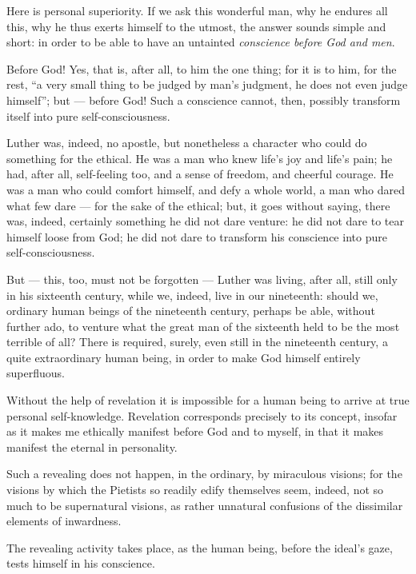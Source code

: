 \documentclass[12pt,a4paper]{book}
\begin{document}
Here is personal superiority. If we ask this wonderful man, why he endures all this, why he thus exerts himself to the utmost, the answer sounds simple and short: in order to be able to have an untainted \emph{conscience before God and men}.

Before God! Yes, that is, after all, to him the one thing; for it is to him, for the rest, ``a very small thing to be judged by man's judgment, he does not even judge himself''; but --- before God! Such a conscience cannot, then, possibly transform itself into pure self-consciousness.

Luther was, indeed, no apostle, but nonetheless a character who could do something for the ethical. He was a man who knew life's joy and life's pain; he had, after all, self-feeling too, and a sense of freedom, and cheerful courage. He was a man who could comfort himself, and defy a whole world, a man who dared what few dare --- for the sake of the ethical; but, it goes without saying, there was, indeed, certainly something he did not dare venture: he did not dare to tear himself loose from God; he did not dare to transform his conscience into pure self-consciousness.

But --- this, too, must not be forgotten --- Luther was living, after all, still only in his sixteenth century, while we, indeed, live in our
nineteenth: should we, ordinary human beings of the nineteenth century, perhaps be able, without further ado, to venture what the great man of the sixteenth held to be the most terrible of all? There is required, surely, even still in the nineteenth century, a quite extraordinary human being, in order to make God himself entirely superfluous.

Without the help of revelation it is impossible for a human being to arrive at true personal self-knowledge. Revelation corresponds precisely to its concept, insofar as it makes me ethically manifest before God and to myself, in that it makes manifest the eternal in personality.

Such a revealing does not happen, in the ordinary, by miraculous visions; for the visions by which the Pietists so readily edify themselves seem, indeed, not so much to be supernatural visions, as rather unnatural confusions of the dissimilar elements of inwardness.

The revealing activity takes place, as the human being, before the ideal's gaze, tests himself in his conscience.
\end{document}
